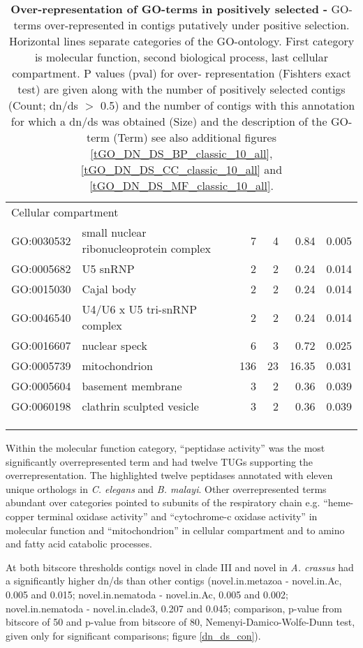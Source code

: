 \begin{longtable}{lp{4.5cm}rrrl}
  \multicolumn{6}{l}{Cellular compartment}  \\ 
  GO:0030532 & small nuclear ribonucleoprotein complex &   7 &   4 & 0.84 & 0.005 \\ 
  GO:0005682 & U5 snRNP &   2 &   2 & 0.24 & 0.014 \\ 
  GO:0015030 & Cajal body &   2 &   2 & 0.24 & 0.014 \\ 
  GO:0046540 & U4/U6 x U5 tri-snRNP complex &   2 &   2 & 0.24 & 0.014 \\ 
  GO:0016607 & nuclear speck &   6 &   3 & 0.72 & 0.025 \\ 
  GO:0005739 & mitochondrion & 136 &  23 & 16.35 & 0.031 \\ 
  GO:0005604 & basement membrane &   3 &   2 & 0.36 & 0.039 \\ 
  GO:0060198 & clathrin sculpted vesicle &   3 &   2 & 0.36 & 0.039 \\ 
\hline\\
\caption[Over-representation of GO-terms in positively
selected]{\textbf{Over-representation of GO-terms in positively
    selected -} GO-terms over-represented in contigs putatively under
  positive selection. Horizontal lines separate categories of the
  GO-ontology. First category is molecular function, second biological
  process, last cellular compartment. P values (pval) for over-
  representation (Fishters exact test) are given along with the number
  of positively selected contigs (Count; dn/ds $>$ 0.5) and the number
  of contigs with this annotation for which a dn/ds was obtained
  (Size) and the description of the GO-term (Term) see also additional
  figures \ref{tGO_DN_DS_BP_classic_10_all},
  \ref{tGO_DN_DS_CC_classic_10_all} and
  \ref{tGO_DN_DS_MF_classic_10_all}.}\\
\label{go-pos}
\end{longtable}

Within the molecular function category, ``peptidase activity'' was the
most significantly overrepresented term and had twelve TUGs supporting the
overrepresentation. The highlighted twelve peptidases annotated with
eleven unique orthologs in \textit{C. elegans} and \textit{B. malayi}.
Other overrepresented terms abundant over categories pointed to
subunits of the respiratory chain e.g. ``heme-copper terminal oxidase
activity'' and ``cytochrome-c oxidase activity'' in molecular function
and ``mitochondrion'' in cellular compartment and to amino and fatty
acid catabolic processes.

At both bitscore thresholds contigs novel in clade III and novel in
\textit{A. crassus} had a significantly higher dn/ds than other
contigs (novel.in.metazoa - novel.in.Ac, 0.005 and 0.015;
novel.in.nematoda - novel.in.Ac, 0.005 and 0.002; novel.in.nematoda -
novel.in.clade3, 0.207 and 0.045; comparison, p-value from bitscore of
50 and p-value from bitscore of 80, Nemenyi-Damico-Wolfe-Dunn test,
given only for significant comparisons; figure \ref{dn_ds_con}).


